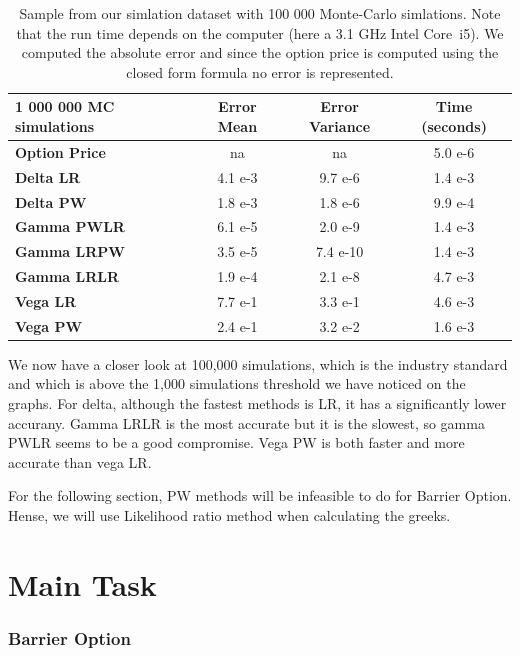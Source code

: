 \documentclass[11pt,a4paper,fleqn]{article}
\begin{document}
\begin{table} [h!]
  \centering
\label{eco:values}
\begin{tabular}{|l|c|c|c|}
\hline
1 000 000 MC simulations      & \textbf{Error Mean} & \textbf{Error Variance} & \textbf{Time (seconds)} \\ \hline
\textbf{Option Price} & na &          na         & 5.0 e-6 \\ \hline
\textbf{Delta LR} & 4.1 e-3 & 9.7 e-6 & 1.4 e-3\\
\textbf{Delta PW} & 1.8 e-3 & 1.8 e-6 & 9.9 e-4\\ \hline
\textbf{Gamma PWLR} & 6.1 e-5 & 2.0 e-9 & 1.4 e-3\\
\textbf{Gamma LRPW} & 3.5 e-5 & 7.4 e-10 & 1.4 e-3\\
\textbf{Gamma LRLR} & 1.9 e-4 & 2.1 e-8 & 4.7 e-3\\ \hline
\textbf{Vega LR} & 7.7 e-1 & 3.3 e-1 & 4.6 e-3\\
\textbf{Vega PW} & 2.4 e-1 & 3.2 e-2 & 1.6 e-3\\ \hline
\end{tabular}

\caption{Sample from our simlation dataset with 100 000 Monte-Carlo simlations. Note that the run time depends on the computer (here a 3.1 GHz Intel Core~i5). We computed the absolute error and since the option price is computed using the closed form formula no error is represented.}

\end{table}

We now have a closer look at 100,000 simulations, which is the industry standard and which is above the 1,000 simulations threshold we have noticed on the graphs.
For delta, although the fastest methods is LR, it has a significantly lower accurany. Gamma LRLR is the most accurate but it is the slowest, so gamma PWLR seems to be a good compromise. Vega PW is both faster and more accurate than vega LR.

For the following section, PW methods will be infeasible to do for Barrier Option. Hense, we will use Likelihood ratio method when calculating the greeks.

\FloatBarrier
\newpage
\part{Main Task}
\section{Barrier Option}
\end{document}
